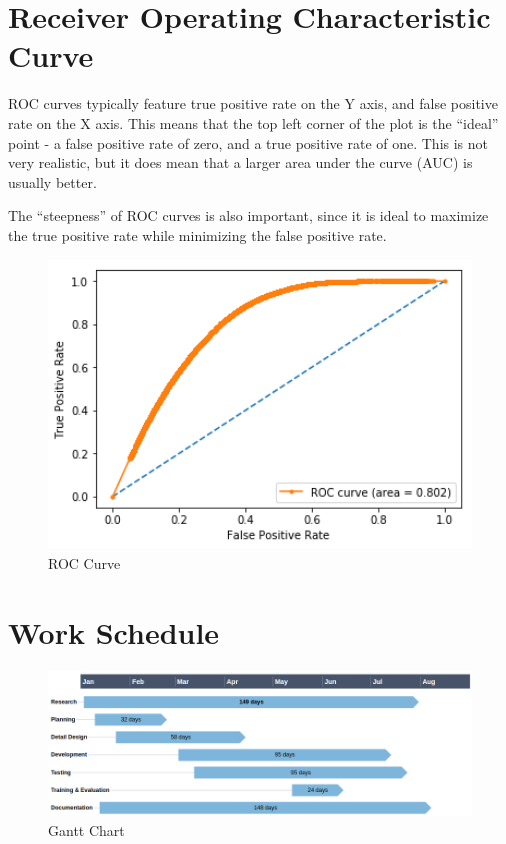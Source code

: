 \clearpage
\section{Receiver Operating Characteristic Curve}
\ac{ROC} curves typically feature true positive rate on the Y axis, and false positive rate on the X axis. This means that the top left corner of the plot is the “ideal” point - a false positive rate of zero, and a true positive rate of one. This is not very realistic, but it does mean that a larger area under the curve (AUC) is usually better.

The “steepness” of \ac{ROC} curves is also important, since it is ideal to maximize the true positive rate while minimizing the false positive rate.


\begin{figure}[tbh]
\begin{center}
	\includegraphics[width = 4.5in]{images/roc.png}
	\caption{\ac{ROC} Curve} %
\end{center}
\end{figure}

\section{Work Schedule}
\begin{figure}[H]
\begin{center}
	\includegraphics[width = 6in]{images/gantt_.png}
	\caption{Gantt Chart} %
	\label{Gantt Chart} %
\end{center}
\end{figure}

